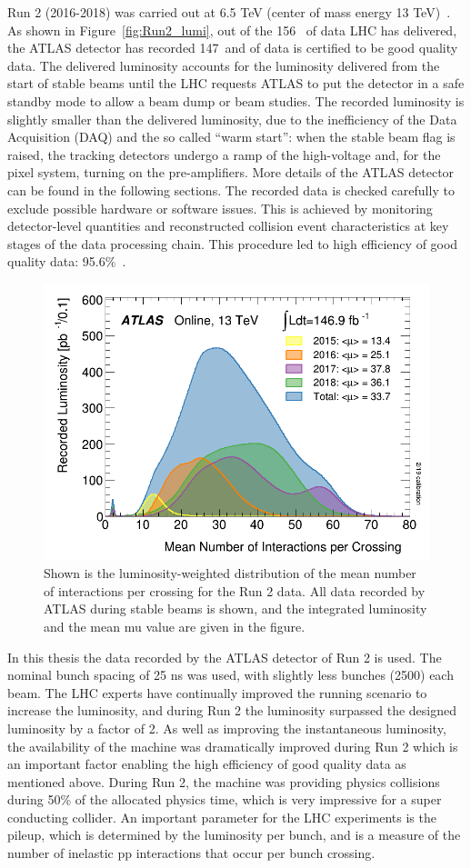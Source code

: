 	Run 2 (2016-2018) was carried out
	at 6.5 TeV (center of mass energy 13 TeV)~\cite{LHC-Run2-Operation}. 
	As shown in Figure~\ref{fig:Run2_lumi}, out of the 156~\fb 
	of data LHC has delivered, the ATLAS detector has recorded 
	147~\fb and \lumi of data is certified to be good quality data.
	The delivered luminosity accounts for the luminosity delivered from the start of 
	stable beams until the LHC requests ATLAS to put the detector in a 
	safe standby mode to allow a beam dump or beam studies. 
	The recorded luminosity is slightly smaller than the delivered luminosity, due 
	to the inefficiency of the Data Acquisition (DAQ) and the so called ``warm start'': 
	when the stable beam flag is raised, 
	the tracking detectors undergo a ramp of the high-voltage and, 
	for the pixel system, turning on the pre-amplifiers. 
	More details of the ATLAS detector can be found in the following sections. 
	The recorded data is checked carefully to exclude possible hardware or software  issues. 
	This is achieved by monitoring detector-level quantities 
	and reconstructed collision event characteristics at key stages of the data processing chain.
	This procedure led to high efficiency of good quality data: 95.6\%~\cite{aad2020atlas}.	

	\begin{figure}[bht]
		\begin{centering}	
		\includegraphics[width=.4\textwidth]{Detector_plots/Run2_pileup.png}
		\caption{ Shown is the luminosity-weighted distribution of the mean number of 
		interactions per crossing for the Run 2 data. All data recorded by ATLAS during 
		stable beams is shown, and the integrated luminosity and 
		the mean mu value are given in the figure. 
			}
		\label{fig:Run2_pileup}
		\end{centering}
	\end{figure}

	In this thesis the \lumi data recorded by the ATLAS detector of Run 2 is used.
	The nominal bunch spacing of 25 ns was used, with slightly less bunches (2500) each beam.
	The LHC experts have continually improved the running scenario to increase the luminosity,
	and during Run 2 the luminosity surpassed the designed luminosity by a factor of 2. 
	As well as improving the instantaneous luminosity, the availability of the machine
	was dramatically improved during Run 2 which is an important factor enabling the high efficiency 
	of good quality data as mentioned above.
	During Run 2, the machine was providing physics collisions during 50\% of 
	the allocated physics time, which is very impressive for a super conducting collider. 
	An important parameter for the LHC experiments is the pileup, 
	which is determined by the luminosity per bunch, and is a measure of 
	the number of inelastic pp interactions that occur per bunch crossing. 

